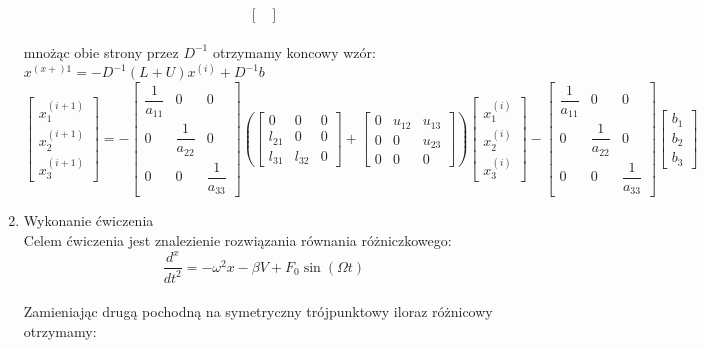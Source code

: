 \documentclass[12pt,a4paper]{article}
\begin{document}
\begin{enumerate}
\begin{equation}
\begin{bmatrix}
\end{bmatrix}
\end{equation}\\
mnożąc obie strony przez $D^{-1}$ otrzymamy koncowy wzór:\\
$x^{(x+)1}=-D^{-1}(L+U)x^{(i)}+D^{-1}b$
\begin{equation}
\begin{bmatrix}
x_1^{(i+1)}\\x_2^{(i+1)}\\x_3^{(i+1)}
\end{bmatrix}=
-\begin{bmatrix}
\dfrac{1}{a_{11}}&0&0\\
0&\dfrac{1}{a_{22}}&0\\
0&0&\dfrac{1}{a_{33}}
\end{bmatrix}
\left(
\begin{bmatrix}
0&0&0\\
l_{21}&0&0\\
l_{31}&l_{32}&0
\end{bmatrix}+
\begin{bmatrix}
0&u_{12}&u_{13}\\
0&0&u_{23}\\
0&0&0
\end{bmatrix}
\right)
\begin{bmatrix}
x_1^{(i)}\\
x_2^{(i)}\\
x_3^{(i)}
\end{bmatrix}
-\begin{bmatrix}
\dfrac{1}{a_{11}}&0&0\\
0&\dfrac{1}{a_{22}}&0\\
0&0&\dfrac{1}{a_{33}}
\end{bmatrix}
\begin{bmatrix}
b_1\\b_2\\b_3
\end{bmatrix}
\end{equation}
\item Wykonanie ćwiczenia\\
Celem ćwiczenia jest znalezienie rozwiązania równania różniczkowego:\\
\begin{equation}
\dfrac{d^x}{dt^2}=-\omega^2x-\beta V+F_0\sin(\Omega t)
\end{equation}\\
Zamieniając drugą pochodną na symetryczny trójpunktowy iloraz różnicowy otrzymamy:\\

\end{enumerate}
\end{document}
